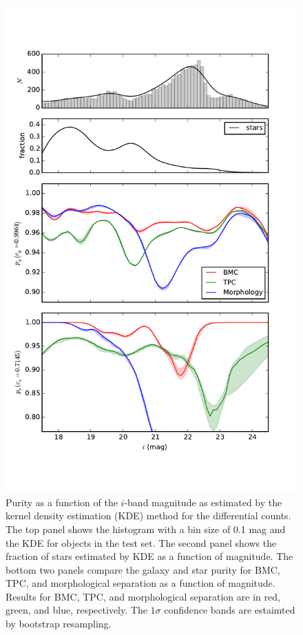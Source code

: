 \documentclass[useAMS,usenatbib]{mn2e}
\begin{document}
\begin{figure}
  \centering
  \includegraphics[width=\linewidth]{figures/purity_mag.pdf}
  \caption{Purity as a function of the $i$-band magnitude
           as estimated by the kernel density estimation (KDE) method
           for the differential counts.
           The top panel shows the histogram with a bin size of 0.1 mag
           and the KDE for objects in the test set.
           The second panel shows the fraction of stars estimated by KDE
           as a function of magnitude.
           The bottom two panels compare
           the galaxy and star purity for BMC, TPC, and 
           morphological separation as a function of magnitude.
           Results for BMC, TPC, and morphological separation are in
           red, green, and blue, respectively.
           The $1 \sigma$ confidence bands are estaimted by
           bootstrap resampling.}
  \label{fig:purity_mag}
\end{figure}
\end{document}
